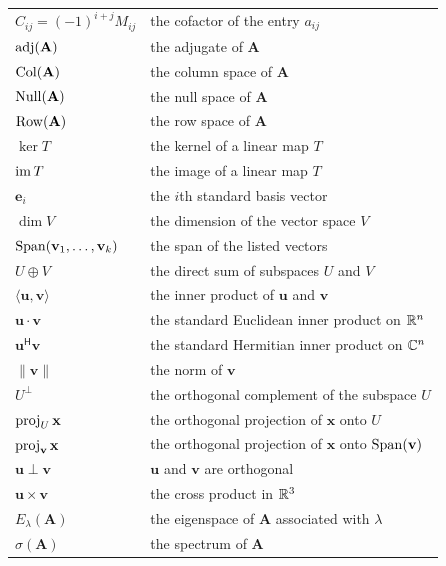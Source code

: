{\begin{longtable}{@{}L{0.27\textwidth}L{0.65\textwidth}@{}}
        $C_{ij}=(-1)^{i+j}M_{ij}$ & the cofactor of the entry $a_{ij}$ \\
        $\operatorname{adj}(\mathbf{A})$ & the adjugate of $\mathbf{A}$ \\
        $\operatorname{Col}(\mathbf{A})$ & the column space of $\mathbf{A}$ \\
        $\operatorname{Null}(\mathbf{A})$ & the null space of $\mathbf{A}$ \\
        $\operatorname{Row}(\mathbf{A})$ & the row space of $\mathbf{A}$ \\
        $\ker T$ & the kernel of a linear map $T$ \\
        $\operatorname{im} T$ & the image of a linear map $T$ \\
        $\mathbf{e}_i$ & the $i$th standard basis vector \\
        $\dim V$ & the dimension of the vector space $V$ \\
        $\operatorname{Span}(\mathbf{v}_1,\dots,\mathbf{v}_k)$ & the span of the listed vectors \\
        $U\oplus V$ & the direct sum of subspaces $U$ and $V$ \\
        $\langle\mathbf{u},\mathbf{v}\rangle$ & the inner product of $\mathbf{u}$ and $\mathbf{v}$ \\
        $\mathbf{u}\cdot\mathbf{v}$ & the standard Euclidean inner product on $\mathbb{R}^n$ \\
        $\mathbf{u}^{\mathsf H}\mathbf{v}$ & the standard Hermitian inner product on $\mathbb{C}^n$ \\
        $\|\mathbf{v}\|$ & the norm of $\mathbf{v}$ \\
        $U^\perp$ & the orthogonal complement of the subspace $U$ \\
        $\operatorname{proj}_U\mathbf{x}$ & the orthogonal projection of $\mathbf{x}$ onto $U$ \\
        $\operatorname{proj}_{\mathbf{v}}\mathbf{x}$ & the orthogonal projection of $\mathbf{x}$ onto $\operatorname{Span}(\mathbf{v})$ \\
        $\mathbf{u}\perp\mathbf{v}$ & $\mathbf{u}$ and $\mathbf{v}$ are orthogonal \\
        $\mathbf{u}\times\mathbf{v}$ & the cross product in $\mathbb{R}^3$ \\
        $E_\lambda(\mathbf{A})$ & the eigenspace of $\mathbf{A}$ associated with $\lambda$ \\
        $\sigma(\mathbf{A})$ & the spectrum of $\mathbf{A}$ \\
    \end{longtable}
    }


